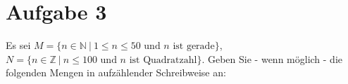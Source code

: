 \section*{Aufgabe 3}

Es sei $M = \{n \in \mathbb{N} \ | \ 1 \leq n \leq 50 \text{ und } n \text{ ist gerade} \}$, $N = \{n \in \mathbb{Z} \ | \ n \leq 100 \text{ und } n \text{ ist Quadratzahl} \}$.
Geben Sie - wenn möglich - die folgenden Mengen in aufzählender Schreibweise an:\\